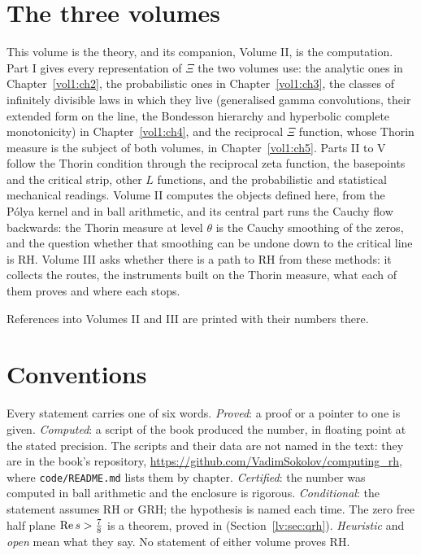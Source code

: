 
\section{The three volumes}\label{ov1:sec:volumes}

This volume is the theory, and its companion, Volume II, is the computation. Part I gives every representation of $\Xi$ the two volumes use: the analytic ones in Chapter~\ref{vol1:ch2}, the probabilistic ones in Chapter~\ref{vol1:ch3}, the classes of infinitely divisible laws in which they live (generalised gamma convolutions, their extended form on the line, the Bondesson hierarchy and hyperbolic complete monotonicity) in Chapter~\ref{vol1:ch4}, and the reciprocal $\Xi$ function, whose Thorin measure is the subject of both volumes, in Chapter~\ref{vol1:ch5}. Parts II to V follow the Thorin condition through the reciprocal zeta function, the basepoints and the critical strip, other $L$ functions, and the probabilistic and statistical mechanical readings. Volume II computes the objects defined here, from the P\'olya kernel and in ball arithmetic, and its central part runs the Cauchy flow backwards: the Thorin measure at level $\theta$ is the Cauchy smoothing of the zeros, and the question whether that smoothing can be undone down to the critical line is RH. Volume III asks whether there is a path to RH from these methods: it collects the routes, the instruments built on the Thorin measure, what each of them proves and where each stops.

References into Volumes II and III are printed with their numbers there.

\section{Conventions}\label{ov1:sec:conventions}

Every statement carries one of six words. \emph{Proved}: a proof or a pointer to one is given. \emph{Computed}: a script of the book produced the number, in floating point at the stated precision. The scripts and their data are not named in the text: they are in the book's repository, \url{https://github.com/VadimSokolov/computing_rh}, where \texttt{code/README.md} lists them by chapter. \emph{Certified}: the number was computed in ball arithmetic and the enclosure is rigorous. \emph{Conditional}: the statement assumes RH or GRH; the hypothesis is named each time. The zero free half plane $\operatorname{Re} s>\frac78$ is a theorem, proved in \cite{OAI26a} (Section~\ref{lv:sec:qrh}). \emph{Heuristic} and \emph{open} mean what they say. No statement of either volume proves RH.

